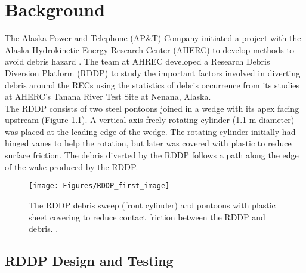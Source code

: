 
\chapter{Background} %

\label{Chapter2} %

The Alaska Power and Telephone (AP\&T) Company initiated a project with the Alaska Hydrokinetic Energy Research Center (AHERC) to develop methods to avoid debris hazard \cite{Reference6}. The team at AHREC developed a Research Debris Diversion Platform (RDDP) to study the important factors involved in diverting debris around the RECs using the statistics of debris occurrence from its studies at AHERC's Tanana River Test Site at Nenana, Alaska.\\
The RDDP consists of two steel pontoons joined in a wedge with its apex facing upstream (Figure \ref{fig:RDDP_first_image}). A vertical-axis freely rotating cylinder (1.1 m diameter) was placed at the leading edge of the wedge. The rotating cylinder initially had hinged vanes to help the rotation, but later was covered with plastic to reduce surface friction. The debris diverted by the RDDP follows a path along the edge of the wake produced by the RDDP.\\
\begin{figure}
\centering
\texttt{[image: Figures/RDDP\_first\_image]}
\caption{\label{fig:RDDP_first_image}The RDDP debris sweep (front cylinder) and pontoons with plastic sheet covering to reduce contact friction between the RDDP and debris. \cite{Reference6}.}
\end{figure}
\section{RDDP Design and Testing}
